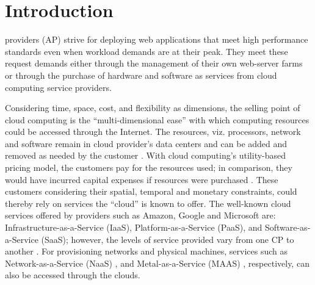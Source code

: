 \documentclass[10pt,journal,cspaper,compsoc]{IEEEtran}
\begin{document}
\maketitle


\IEEEdisplaynotcompsoctitleabstractindextext



\IEEEpeerreviewmaketitle



\section{Introduction}
\label{sec:Introduction}








 providers (AP) strive for deploying web applications that meet high performance standards even when workload demands are at their peak. They meet these request demands either through the management of their own web-server farms or through the purchase of hardware and software as services from cloud computing service providers.

Considering time, space, cost, and flexibility as dimensions, the selling point of cloud computing is the ``multi-dimensional ease'' \cite{2012_ucc2012YasDas} with which computing resources could be accessed through the Internet. The resources, viz. processors, network and software remain in cloud provider's data centers and can be added and removed as needed by the customer \cite{NIST_CloudDefn,velte2009cloud1}. With cloud computing's utility-based pricing model, the customers pay for the resources used; in comparison, they would have incurred capital expenses if resources were purchased \cite{velte2009cloud1}. These customers considering their spatial, temporal and monetary constraints, could thereby rely on services the ``cloud'' \cite{zhang2010cloud13} is known to offer. The well-known cloud services offered by providers such as Amazon, Google and Microsoft are: Infrastructure-as-a-Service (IaaS), Platform-as-a-Service (PaaS), and Software-as-a-Service (SaaS); however, the levels of service provided vary from one CP to another \cite{ranjan2010peer12,zhang2010cloud13}. For provisioning networks and physical machines, services such as Network-as-a-Service (NaaS) \cite{2012_NAAS_Costa,2011_DynamicallyScalingApps}, and Metal-as-a-Service (MAAS) \cite{2013_MAAS_Canonical,2012_MAASEffect}, respectively, can also be accessed through the clouds.
\end{document}
